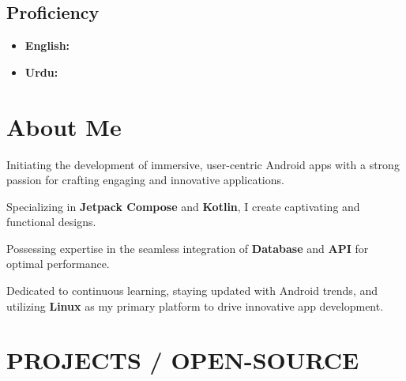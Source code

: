 \documentclass[bold]{deedy-resume-openfont}
\begin{document}
\begin{minipage}[t]{0.33\textwidth}
\subsection{Proficiency}
\begin{itemize}[label=\textbullet, leftmargin=*, topsep=5pt, itemsep=-1ex]
    \item \textbf{English:} 
    \item \textbf{Urdu:} 
\end{itemize}
\sectionsep


%
%

\end{minipage} 
\hfill
\begin{minipage}[t]{0.66\textwidth} 


\section{About Me}
\vspace{\topsep} %
\vspace{4pt} %
\begin{tightemize}
    \item Initiating the development of immersive, user-centric Android apps with a strong passion for crafting engaging and innovative applications.
    \item Specializing in \textbf{Jetpack Compose} and \textbf{Kotlin}, I create captivating and functional designs.
    \item Possessing expertise in the seamless integration of \textbf{Database} and \textbf{API} for optimal performance.
    \item Dedicated to continuous learning, staying updated with Android trends, and utilizing \textbf{Linux} as my primary platform to drive innovative app development.
\end{tightemize}
\sectionsep




\section*{PROJECTS / OPEN-SOURCE}


\end{minipage}
\end{document}
